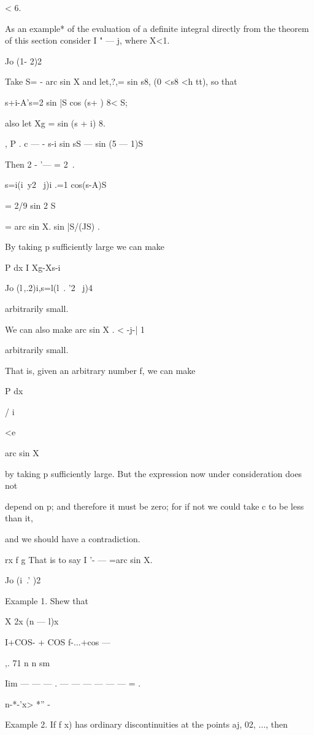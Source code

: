 < 6.

As an example* of the evaluation of a definite integral directly from
the theorem of this section consider I " — j, where X<1.

Jo (1- 2)2

Take S= - arc sin X and let,?,= sin s8, (0 <s8 <h tt), so that

 s+i-A's=2 sin |S cos (s+ ) 8< S;

also let Xg = sin (s + i) 8.

, P . c — - s-i sin sS — sin (5 — 1)S

Then 2 - '— = 2 \,.

s=i(i\ y2 \ j)i .=1 cos(s-A)S

= 2/9 sin 2 S

= arc sin X. sin |S/(JS) .

By taking p sufficiently large we can make



P dx I Xg-Xs-i

Jo (l\,,.2)i,s=l(l\ . '2 \ j)4



arbitrarily small.

We can also make arc sin X . < -j-| 1

arbitrarily small.

That is, given an arbitrary number f, we can make



P dx

/ i~



<e



arc sin X

by taking p sufficiently large. But the expression now under
consideration does not

depend on p; and therefore it must be zero; for if not we could take
c to be less than it,

and we should have a contradiction.

rx f g That is to say I '- — =arc sin X.

Jo (i\ .' )2

Example 1. Shew that

X 2x (n — l)x

I+COS- + COS f-...+cos —

,. 71 n n sm

Iim — — — . — — — — — — = .

n-*-'x> *'' -

Example 2. If f x) has ordinary discontinuities at the points aj, 02,
..., then

